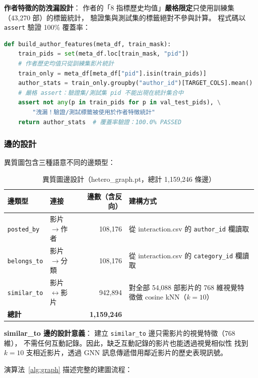 \documentclass[12pt, a4paper]{article}
\begin{document}
\textbf{作者特徵的防洩漏設計}：
作者的「8 指標歷史均值」\textbf{嚴格限定}只使用訓練集（43,270 部）的標籤統計，
驗證集與測試集的標籤絕對不參與計算。
程式碼以 \texttt{assert} 驗證 100\% 覆蓋率：
\begin{lstlisting}[language=Python, caption=防洩漏驗證程式碼]
def build_author_features(meta_df, train_mask):
    train_pids = set(meta_df.loc[train_mask, "pid"])
    # 作者歷史均值只從訓練集影片統計
    train_only = meta_df[meta_df["pid"].isin(train_pids)]
    author_stats = train_only.groupby("author_id")[TARGET_COLS].mean()
    # 嚴格 assert：驗證集/測試集 pid 不能出現在統計集合中
    assert not any(p in train_pids for p in val_test_pids), \
        "洩漏！驗證/測試標籤被使用於作者特徵統計"
    return author_stats  # 覆蓋率驗證：100.0% PASSED
\end{lstlisting}

\subsubsection{邊的設計}

異質圖包含三種語意不同的邊類型：

\begin{table}[H]
\centering
\caption{異質圖邊設計（hetero\_graph.pt，總計 1,159,246 條邊）}
\small
\begin{tabular}{llr>{\raggedright\arraybackslash}p{5cm}}
\toprule
\textbf{邊類型} & \textbf{連接} & \textbf{邊數（含反向）} & \textbf{建構方式} \\
\midrule
\texttt{posted\_by} & 影片$\to$作者 & 108,176
  & 從 interaction.csv 的 \texttt{author\_id} 欄讀取 \\
\texttt{belongs\_to} & 影片$\to$分類 & 108,176
  & 從 interaction.csv 的 \texttt{category\_id} 欄讀取 \\
\texttt{similar\_to} & 影片$\leftrightarrow$影片 & 942,894
  & 對全部 54,088 部影片的 768 維視覺特徵做 cosine kNN（$k=10$） \\
\midrule
\textbf{總計} & & \textbf{1,159,246} & \\
\bottomrule
\end{tabular}
\end{table}

\textbf{similar\_to 邊的設計意義}：
建立 \texttt{similar\_to} 邊只需影片的視覺特徵（768 維），
不需任何互動記錄。因此，缺乏互動記錄的影片也能透過視覺相似性
找到 $k=10$ 支相近影片，透過 GNN 訊息傳遞借用鄰近影片的歷史表現訊號。

演算法~\ref{alg:graph} 描述完整的建圖流程：
\end{document}
